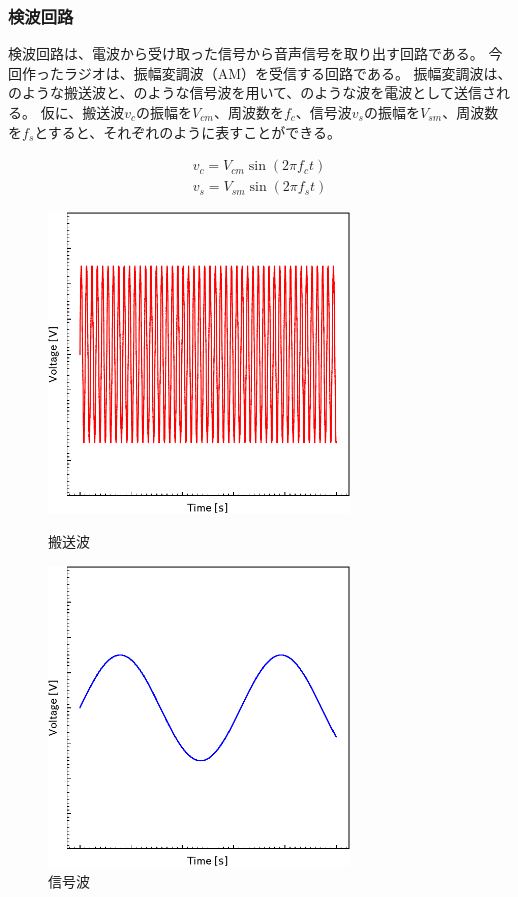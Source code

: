 \documentclass[report.tex]{subfiles}
\begin{document}
\subsubsection{検波回路}

検波回路は、電波から受け取った信号から音声信号を取り出す回路である。
今回作ったラジオは、振幅変調波（AM）を受信する回路である。
振幅変調波は、のような搬送波と、のような信号波を用いて、のような波を電波として送信される。
仮に、搬送波\(v_c\)の振幅を\(V_{cm}\)、周波数を\(f_c\)、信号波\(v_s\)の振幅を\(V_{sm}\)、周波数を\(f_s\)とすると、それぞれのように表すことができる。

\begin{align}
	v_c = V_{cm} \sin(2 \pi f_c t) \label{eq:v_c} \\
	v_s = V_{sm} \sin(2 \pi f_s t) \label{eq:v_s}
\end{align}

\begin{figure}[H]
	\begin{minipage}[b]{0.5\columnwidth}
		\centering
		\includegraphics[width=8cm]{fig/5V.pdf}
		\caption{搬送波}
		\label{fig:5V}
	\end{minipage}
	\begin{minipage}[b]{0.5\columnwidth}
		\centering
		\includegraphics[width=8cm]{fig/3V.pdf}
		\caption{信号波}
		\label{fig:3V}
	\end{minipage}
\end{figure}
\end{document}
